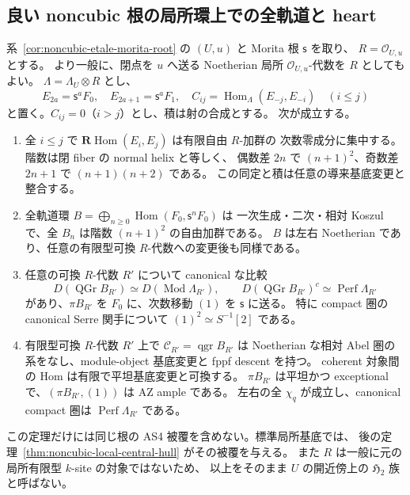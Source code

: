\subsection{良い noncubic 根の局所環上での全軌道と heart}

\begin{theorem}
\label{thm:noncubic-local-tails-effectivity}
系~\ref{cor:noncubic-etale-morita-root} の $(U,u)$ と Morita 根 $\mathsf s$ を取り、
$R=\mathcal O_{U,u}$ とする。
より一般に、閉点を $u$ へ送る Noetherian 局所 $\mathcal O_{U,u}$-代数を $R$ としてもよい。
$\Lambda=\Lambda_U\otimes R$ とし、
\[
 E_{2a}=\mathsf s^aF_0,\quad E_{2a+1}=\mathsf s^aF_1,
 \quad C_{ij}=\operatorname{Hom}_{\Lambda}(E_{-j},E_{-i})\quad(i\le j)
\]
と置く。$C_{ij}=0$（$i>j$）とし、積は射の合成とする。
次が成立する。
\begin{enumerate}
\item 全 $i\le j$ で $\mathbf R\operatorname{Hom}(E_i,E_j)$ は有限自由 $R$-加群の
  次数零成分に集中する。階数は閉 fiber の normal helix と等しく、
  偶数差 $2n$ で $(n+1)^2$、奇数差 $2n+1$ で $(n+1)(n+2)$ である。
  この同定と積は任意の導来基底変更と整合する。
\item 全軌道環
  $B=\bigoplus_{n\ge0}\operatorname{Hom}(F_0,\mathsf s^nF_0)$ は
  一次生成・二次・相対 Koszul で、全 $B_n$ は階数 $(n+1)^2$ の自由加群である。
  $B$ は左右 Noetherian であり、任意の有限型可換 $R$-代数への変更後も同様である。
\item 任意の可換 $R$-代数 $R'$ について canonical な比較
  \[
  D(\operatorname{QGr}B_{R'})\simeq D(\operatorname{Mod}\Lambda_{R'}),
  \qquad D(\operatorname{QGr}B_{R'})^c\simeq\operatorname{Perf}\Lambda_{R'}
  \]
  があり、$\pi B_{R'}$ を $F_0$ に、次数移動 $(1)$ を $\mathsf s$ に送る。
  特に compact 圏の canonical Serre 関手について $(1)^2\simeq S^{-1}[2]$ である。
\item 有限型可換 $R$-代数 $R'$ 上で $\mathcal C_{R'}=\operatorname{qgr}B_{R'}$ は
  Noetherian な相対 Abel 圏の系をなし、module-object 基底変更と fppf descent を持つ。
  coherent 対象間の Hom は有限で平坦基底変更と可換する。
  $\pi B_{R'}$ は平坦かつ exceptional で、$(\pi B_{R'},(1))$ は AZ ample である。
  左右の全 $\chi_q$ が成立し、canonical compact 圏は $\operatorname{Perf}\Lambda_{R'}$ である。
\end{enumerate}
この定理だけには同じ根の AS4 被覆を含めない。標準局所基底では、
後の定理~\ref{thm:noncubic-local-central-hull} がその被覆を与える。
また $R$ は一般に元の局所有限型 $k$-site の対象ではないため、
以上をそのまま $U$ の開近傍上の $\mathfrak H_2$ 族と呼ばない。
\end{theorem}

